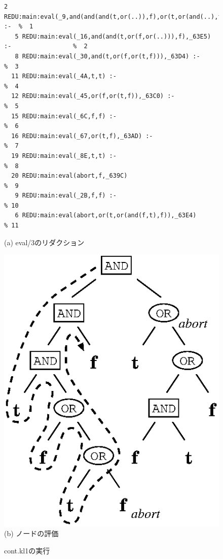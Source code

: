 \documentclass[a4,titlepage]{jsreport}
\begin{document}
\begin{figure}[t]
\begin{center}
\begin{Verbatim}[baselinestretch=0.8]
   2 REDU:main:eval(_9,and(and(and(t,or(..)),f),or(t,or(and(..),f))),_3) :-  %  1
   5 REDU:main:eval(_16,and(and(t,or(f,or(..))),f),_63E5) :-                 %  2
   8 REDU:main:eval(_30,and(t,or(f,or(t,f))),_63D4) :-                       %  3
  11 REDU:main:eval(_4A,t,t) :-                                              %  4
  12 REDU:main:eval(_45,or(f,or(t,f)),_63C0) :-                              %  5
  15 REDU:main:eval(_6C,f,f) :-                                              %  6
  16 REDU:main:eval(_67,or(t,f),_63AD) :-                                    %  7
  19 REDU:main:eval(_8E,t,t) :-                                              %  8
  20 REDU:main:eval(abort,f,_639C)                                           %  9
   9 REDU:main:eval(_2B,f,f) :-                                              % 10
   6 REDU:main:eval(abort,or(t,or(and(f,t),f)),_63E4)                        % 11

\end{Verbatim}

(a) eval/3のリダクション\\
\vspace{8mm}

\includegraphics{fig/andor_tree2_cont.eps}\\
(b) ノードの評価
\caption{cont.kl1の実行}
\label{andor_cont_log}
\end{center}
\end{figure}
\end{document}
